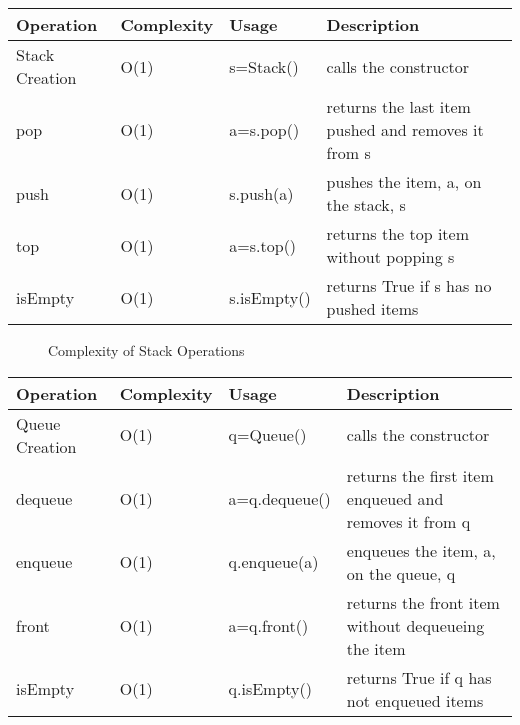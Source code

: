 \documentclass[letterpaper,10pt,english]{sphinxmanual}
\begin{document}
\begin{savenotes}\sphinxattablestart
\centering
\begin{tabulary}{\linewidth}[t]{|T|T|T|T|}
\hline
\sphinxstyletheadfamily 
Operation
&\sphinxstyletheadfamily 
Complexity
&\sphinxstyletheadfamily 
Usage
&\sphinxstyletheadfamily 
Description
\\
\hline
Stack Creation
&
O(1)
&
s=Stack()
&
calls the constructor
\\
\hline
pop
&
O(1)
&
a=s.pop()
&
returns the last item pushed and removes it from s
\\
\hline
push
&
O(1)
&
s.push(a)
&
pushes the item, a, on the stack, s
\\
\hline
top
&
O(1)
&
a=s.top()
&
returns the top item without popping s
\\
\hline
isEmpty
&
O(1)
&
s.isEmpty()
&
returns True if s has no pushed items
\\
\hline
\end{tabulary}
\par
\sphinxattableend\end{savenotes}

\begin{figure}[htbp]
\centering
\capstart

\noindent{}
\caption{Complexity of Stack Operations}\label{\detokenize{chap4/chap4:id13}}\end{figure}


\begin{savenotes}\sphinxattablestart
\centering
\begin{tabulary}{\linewidth}[t]{|T|T|T|T|}
\hline
\sphinxstyletheadfamily 
Operation
&\sphinxstyletheadfamily 
Complexity
&\sphinxstyletheadfamily 
Usage
&\sphinxstyletheadfamily 
Description
\\
\hline
Queue Creation
&
O(1)
&
q=Queue()
&
calls the constructor
\\
\hline
dequeue
&
O(1)
&
a=q.dequeue()
&
returns the first item enqueued and removes it from q
\\
\hline
enqueue
&
O(1)
&
q.enqueue(a)
&
enqueues the item, a, on the queue, q
\\
\hline
front
&
O(1)
&
a=q.front()
&
returns the front item without dequeueing the item
\\
\hline
isEmpty
&
O(1)
&
q.isEmpty()
&
returns True if q has not enqueued items
\\
\hline
\end{tabulary}
\par
\sphinxattableend\end{savenotes}
\end{document}
